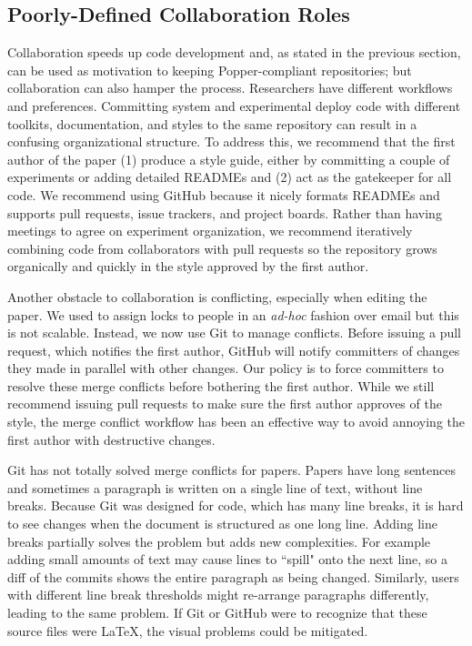 \subsection{Poorly-Defined Collaboration Roles}

Collaboration  speeds up code development and, as stated in the previous
section, can be used as motivation to keeping Popper-compliant repositories;
but collaboration can also hamper the process.  Researchers have different
workflows and preferences. Committing system and experimental deploy code with
different toolkits, documentation, and styles to the same repository can result
in a confusing organizational structure.  To address this, we recommend that
the first author of the paper (1) produce a style guide, either by committing a
couple of experiments or adding detailed READMEs and (2) act as the gatekeeper
for all code. We recommend using GitHub because it nicely formats READMEs and
supports pull requests, issue trackers, and project boards.  Rather than having
meetings to agree on experiment organization, we recommend iteratively
combining code from collaborators with pull requests so the repository grows
organically and quickly in the style approved by the first author.

Another obstacle to collaboration is conflicting, especially when editing
the paper. We used to assign locks to people in an {\it ad-hoc} fashion over
email but this is not scalable. Instead, we now use Git to manage conflicts.
Before issuing a pull request, which notifies the first author, GitHub will
notify committers of changes they made in parallel with other changes. Our
policy is to force committers to resolve these merge conflicts before bothering
the first author. While we still recommend issuing pull requests to make sure
the first author approves of the style, the merge conflict workflow has been an
effective way to avoid annoying the first author with destructive changes.

Git has not totally solved merge conflicts for papers. Papers have long
sentences and sometimes a paragraph is written on a single line of text,
without line breaks. Because Git was designed for code, which has many line
breaks, it is hard to see changes when the document is structured as one long
line. Adding line breaks partially solves the problem but adds new
complexities. For example adding small amounts of text may cause lines to
``spill" onto the next line, so a diff of the commits shows the entire
paragraph as being changed. Similarly, users with different line break
thresholds might re-arrange paragraphs differently, leading to the same
problem. If Git or GitHub were to recognize that these source files were
\LaTeX, the visual problems could be mitigated.

